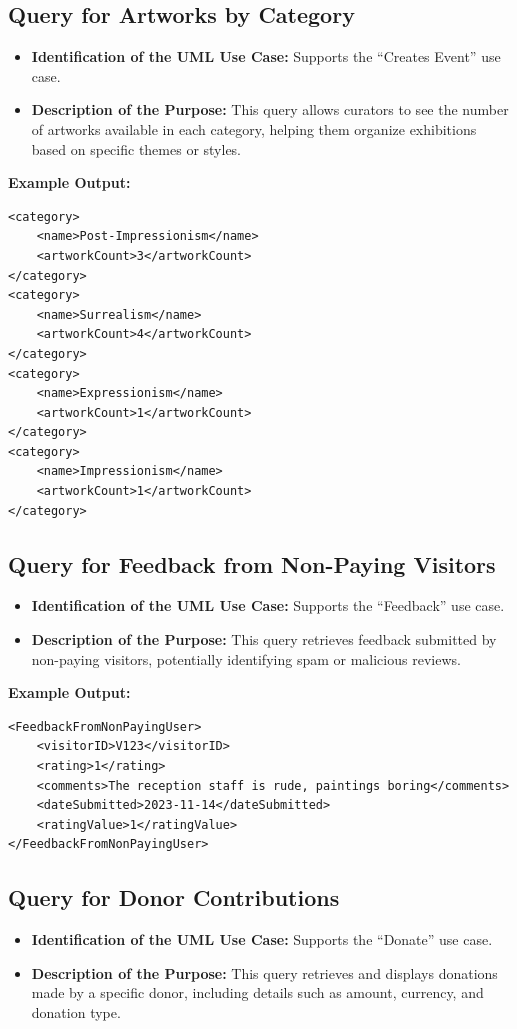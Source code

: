 \documentclass{article} %
\begin{document}
\subsection{Query for Artworks by Category}
\begin{itemize}
    \item \textbf{Identification of the UML Use Case:} Supports the ``Creates Event'' use case.
    \item \textbf{Description of the Purpose:} This query allows curators to see the number of artworks available in each category, helping them organize exhibitions based on specific themes or styles.
\end{itemize}

\textbf{Example Output:}
\begin{verbatim}
<category>
    <name>Post-Impressionism</name>
    <artworkCount>3</artworkCount>
</category>
<category>
    <name>Surrealism</name>
    <artworkCount>4</artworkCount>
</category>
<category>
    <name>Expressionism</name>
    <artworkCount>1</artworkCount>
</category>
<category>
    <name>Impressionism</name>
    <artworkCount>1</artworkCount>
</category>
\end{verbatim}

\subsection{Query for Feedback from Non-Paying Visitors}
\begin{itemize}
    \item \textbf{Identification of the UML Use Case:} Supports the ``Feedback'' use case.
    \item \textbf{Description of the Purpose:} This query retrieves feedback submitted by non-paying visitors, potentially identifying spam or malicious reviews.
\end{itemize}

\textbf{Example Output:}
\begin{verbatim}
<FeedbackFromNonPayingUser>
    <visitorID>V123</visitorID>
    <rating>1</rating>
    <comments>The reception staff is rude, paintings boring</comments>
    <dateSubmitted>2023-11-14</dateSubmitted>
    <ratingValue>1</ratingValue>
</FeedbackFromNonPayingUser>
\end{verbatim}

\subsection{Query for Donor Contributions}
\begin{itemize}
    \item \textbf{Identification of the UML Use Case:} Supports the ``Donate'' use case.
    \item \textbf{Description of the Purpose:} This query retrieves and displays donations made by a specific donor, including details such as amount, currency, and donation type.
\end{itemize}
\end{document}
